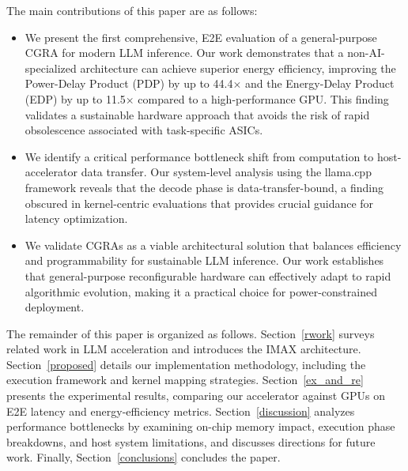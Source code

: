 The main contributions of this paper are as follows:
\begin{itemize}
    \item We present the first comprehensive, E2E evaluation of a general-purpose CGRA for modern LLM inference. Our work demonstrates that a non-AI-specialized architecture can achieve superior energy efficiency, improving the Power-Delay Product (PDP) by up to \num{44.4}$\times$ and the Energy-Delay Product (EDP) by up to \num{11.5}$\times$ compared to a high-performance GPU. This finding validates a sustainable hardware approach that avoids the risk of rapid obsolescence associated with task-specific ASICs.
    \item We identify a critical performance bottleneck shift from computation to host-accelerator data transfer. Our system-level analysis using the llama.cpp framework reveals that the decode phase is data-transfer-bound, a finding obscured in kernel-centric evaluations that provides crucial guidance for latency optimization.
    \item We validate CGRAs as a viable architectural solution that balances efficiency and programmability for sustainable LLM inference. Our work establishes that general-purpose reconfigurable hardware can effectively adapt to rapid algorithmic evolution, making it a practical choice for power-constrained deployment.
\end{itemize}



The remainder of this paper is organized as follows. 
Section~\ref{rwork} surveys related work in LLM acceleration and introduces the IMAX architecture.
Section~\ref{proposed} details our implementation methodology, including the execution framework and kernel mapping strategies.
Section~\ref{ex_and_re} presents the experimental results, comparing our accelerator against GPUs on E2E latency and energy-efficiency metrics.
Section~\ref{discussion} analyzes performance bottlenecks by examining on-chip memory impact, execution phase breakdowns, and host system limitations, and discusses directions for future work.
Finally, Section~\ref{conclusions} concludes the paper.


